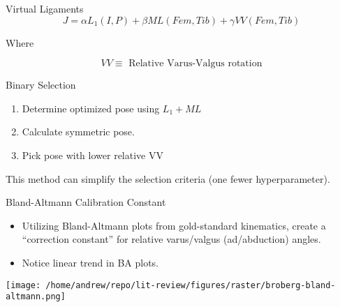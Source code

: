 \documentclass[presentation, aspectratio=1610]{beamer}
\begin{document}
\begin{frame}[label={sec:orgea93833}]{Virtual Ligaments}
\begin{equation*}
  J = \alpha L_{1}(I,P) + \beta ML(Fem,Tib) + \gamma VV(Fem,Tib)
\end{equation*}

Where

\begin{equation*}
  VV \equiv \text{  Relative Varus-Valgus rotation}
\end{equation*}
\end{frame}

\begin{frame}[label={sec:org54d5c68}]{Binary Selection}
\begin{enumerate}
\item Determine optimized pose using \(L_1 + ML\)
\item Calculate symmetric pose.
\item Pick pose with lower relative VV
\end{enumerate}

This method can simplify the selection criteria (one fewer hyperparameter).
\end{frame}
\begin{frame}[label={sec:org5e49510}]{Bland-Altmann Calibration Constant}
\begin{itemize}
\item Utilizing Bland-Altmann plots from gold-standard kinematics, create a ``correction constant'' for relative varus/valgus (ad/abduction) angles.
\item Notice linear trend in BA plots.
\end{itemize}
\begin{center}
\texttt{[image: /home/andrew/repo/lit-review/figures/raster/broberg-bland-altmann.png]}
\end{center}
\end{frame}
\end{document}
